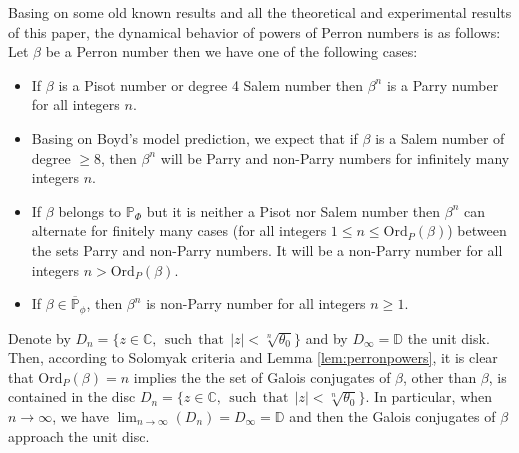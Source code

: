 \documentclass[12pt]{article}
\theoremstyle{plain}
\theoremstyle{remark}
\newcommand{\OrdP}{\mathrm{Ord}_{P}}
\begin{document}
 Basing on some old known results and all the theoretical and experimental results of this paper, the dynamical behavior of powers of Perron numbers is as follows: Let $\beta $ be a Perron number then we have one of the following cases: 
\begin{itemize}
 \item If $\beta $ is a Pisot number or degree 4 Salem number then $\beta^n $ is a Parry number for all integers $n$.
 
 \item Basing on Boyd's model prediction, we expect that if $\beta $ is a Salem number of degree $\geq 8$, then $\beta^n$ will be Parry and non-Parry numbers for infinitely many integers $n$. 
 \item If $\beta $ belongs to $\mathbb{P}_\Phi$ but it is neither a Pisot nor Salem number then $\beta^n $ can alternate for finitely many cases (for all integers $ 1\leq n \leq \OrdP(\beta) $) between the sets Parry and non-Parry numbers. It will be a non-Parry number for all integers $n >\OrdP(\beta)$.

 \item If $\beta \in \overline{\mathbb{P}}_\phi$, then $\beta^n$ is non-Parry number for all integers $n\geq 1$. 

\end{itemize}
 
Denote by $D_n=\{z \in \mathbb{C}, ~~ \mathrm{ such ~~that} ~~|z|< \sqrt[n]{\theta_0}\}$ and by $D_\infty=\mathbb{D}$ the unit disk. 
 Then, according to Solomyak criteria and Lemma \ref{lem:perronpowers}, it is clear that $\OrdP(\beta)=n$ implies the the set of Galois conjugates of $\beta $, other than $\beta$, is contained in the disc $D_n=\{z \in \mathbb{C}, ~~ \mathrm{ such ~~that} ~~|z|< \sqrt[n]{\theta_0}\}$. In particular, when $n \to \infty$, we have $\lim_{n \to \infty}(D_n) = D_\infty = \mathbb{D}$ and then the Galois conjugates of $\beta$ approach the unit disc. %
\end{document}
